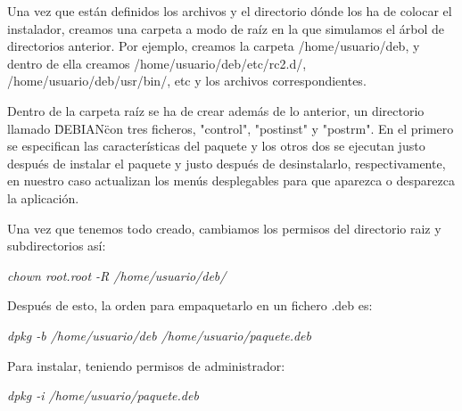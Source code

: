 Una vez que están definidos los archivos y el directorio dónde los ha de colocar el instalador, creamos una carpeta a modo de raíz en la que simulamos el árbol de directorios anterior. Por ejemplo, creamos la carpeta /home/usuario/deb, y dentro de ella creamos /home/usuario/deb/etc/rc2.d/, /home/usuario/deb/usr/bin/, etc y los archivos correspondientes.
\newline

Dentro de la carpeta raíz se ha de crear además de lo anterior, un directorio llamado \"DEBIAN\" con tres ficheros, "control", "postinst" y "postrm". En el primero se especifican las características del paquete y los otros dos se ejecutan justo después de instalar el paquete y justo después de desinstalarlo, respectivamente, en nuestro caso actualizan los menús desplegables para que aparezca o desparezca la aplicación.
\newline

Una vez que tenemos todo creado, cambiamos los permisos del directorio raiz y subdirectorios así:

\begin{center}
    \emph{chown root.root -R /home/usuario/deb/}
\end{center}

Después de esto, la orden para empaquetarlo en un fichero .deb es:

\begin{center}
    \emph{dpkg -b /home/usuario/deb /home/usuario/paquete.deb}
\end{center}

Para instalar, teniendo permisos de administrador:

\begin{center}
    \emph{dpkg -i /home/usuario/paquete.deb}
\end{center}


